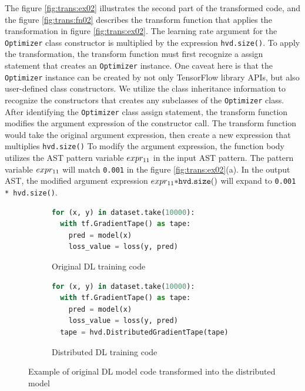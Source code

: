 The figure \ref{fig:trans:ex02} illustrates the second part of the transformed 
code, and the figure \ref{fig:trans:fn02} describes the transform function 
that applies the transformation in figure \ref{fig:trans:ex02}.
The learning rate argument for the {\tt Optimizer} class constructor is 
multiplied by the expression {\tt hvd.size()}. 
To apply the transformation, the transform function must first recognize a
assign statement that creates an {\tt Optimizer} instance.
One caveat here is that the {\tt Optimizer} instance can be 
created by not only TensorFlow library APIs, but also
user-defined class constructors. We utilize the class inheritance information to
recognize the constructors that creates any subclasses of the {\tt Optimizer}
class. 
After identifying the {\tt Optimizer} class assign statement, 
the transform function modifies the argument expression of the
constructor call.
The transform function would take the original argument expression,
then create a new expression that multiplies {\tt hvd.size()}
To modify the argument expression, the function body utilizes the AST pattern
variable $expr_{11}$ in the input AST pattern.
The pattern variable $expr_{11}$ will match {\tt 0.001} in the figure
\ref{fig:trans:ex02}(a).
In the output AST, the modified argument expression 
$expr_{11} {\tt * hvd.size()}$ will expand to {\tt 0.001 * hvd.size()}.

\begin{figure}[ht!]
  \centering
  \begin{subfigure}[t]{0.48\textwidth}
    \begin{lstlisting}[language=Python]
for (x, y) in dataset.take(10000):
  with tf.GradientTape() as tape:
    pred = model(x)
    loss_value = loss(y, pred)\end{lstlisting} 
    \caption{Original DL training code}
  \end{subfigure}
  \hspace{5mm}
  \begin{subfigure}[t]{0.48\textwidth}
    \begin{lstlisting}[language=Python]
for (x, y) in dataset.take(10000):
  with tf.GradientTape() as tape:
    pred = model(x)
    loss_value = loss(y, pred) 
  tape = hvd.DistributedGradientTape(tape)\end{lstlisting}
    \caption{Distributed DL training code}
  \end{subfigure}
  \caption{Example of original DL model code transformed into the distributed model}
  \label{fig:trans:ex03}
\end{figure}

